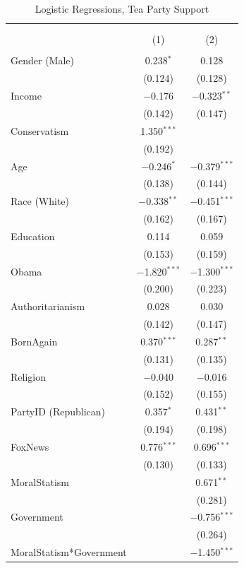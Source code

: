 \documentclass[12pt,]{article}
\begin{document}
\begin{table}[!htbp] \centering 
  \caption{Logistic Regressions, Tea Party Support} 
  \label{} 
\footnotesize 
\begin{tabular}{@{\extracolsep{5pt}}lcc} 
\\[-1.8ex]\hline 
\hline \\[-1.8ex] 
\\[-1.8ex] & (1) & (2)\\ 
\hline \\[-1.8ex] 
 Gender (Male) & 0.238$^{*}$ & 0.128 \\ 
  & (0.124) & (0.128) \\ 
  Income & $-$0.176 & $-$0.323$^{**}$ \\ 
  & (0.142) & (0.147) \\ 
  Conservatism & 1.350$^{***}$ &  \\ 
  & (0.192) &  \\ 
  Age & $-$0.246$^{*}$ & $-$0.379$^{***}$ \\ 
  & (0.138) & (0.144) \\ 
  Race (White) & $-$0.338$^{**}$ & $-$0.451$^{***}$ \\ 
  & (0.162) & (0.167) \\ 
  Education & 0.114 & 0.059 \\ 
  & (0.153) & (0.159) \\ 
  Obama & $-$1.820$^{***}$ & $-$1.300$^{***}$ \\ 
  & (0.200) & (0.223) \\ 
  Authoritarianism & 0.028 & 0.030 \\ 
  & (0.142) & (0.147) \\ 
  BornAgain & 0.370$^{***}$ & 0.287$^{**}$ \\ 
  & (0.131) & (0.135) \\ 
  Religion & $-$0.040 & $-$0.016 \\ 
  & (0.152) & (0.155) \\ 
  PartyID (Republican) & 0.357$^{*}$ & 0.431$^{**}$ \\ 
  & (0.194) & (0.198) \\ 
  FoxNews & 0.776$^{***}$ & 0.696$^{***}$ \\ 
  & (0.130) & (0.133) \\ 
  MoralStatism &  & 0.671$^{**}$ \\ 
  &  & (0.281) \\ 
  Government &  & $-$0.756$^{***}$ \\ 
  &  & (0.264) \\ 
  MoralStatism*Government &  & $-$1.450$^{***}$ \\ 

\end{tabular}
\end{table}
\end{document}
